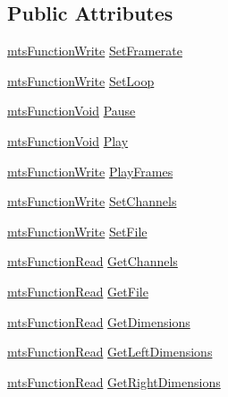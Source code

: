 \subsection*{Public Attributes}
\begin{DoxyCompactItemize}
\item 
\hyperlink{classmts_function_write}{mts\+Function\+Write} \hyperlink{class_i_req_filter_source_image_file_a9195480b969ae523fe65ce266895bd21}{Set\+Framerate}
\item 
\hyperlink{classmts_function_write}{mts\+Function\+Write} \hyperlink{class_i_req_filter_source_image_file_a6c0b3f702b2fe002ad47838d9e6d71cb}{Set\+Loop}
\item 
\hyperlink{classmts_function_void}{mts\+Function\+Void} \hyperlink{class_i_req_filter_source_image_file_a0be80794d65c123743666d95f60a9962}{Pause}
\item 
\hyperlink{classmts_function_void}{mts\+Function\+Void} \hyperlink{class_i_req_filter_source_image_file_a6ee044cc752177e47fbb970e08aa509f}{Play}
\item 
\hyperlink{classmts_function_write}{mts\+Function\+Write} \hyperlink{class_i_req_filter_source_image_file_ad4ffadbe87635cbdfa01daa364f41fb5}{Play\+Frames}
\item 
\hyperlink{classmts_function_write}{mts\+Function\+Write} \hyperlink{class_i_req_filter_source_image_file_a277fb1f67abe840dca507ed8caebc051}{Set\+Channels}
\item 
\hyperlink{classmts_function_write}{mts\+Function\+Write} \hyperlink{class_i_req_filter_source_image_file_acbcd51d212dee25261263e552040eb4f}{Set\+File}
\item 
\hyperlink{classmts_function_read}{mts\+Function\+Read} \hyperlink{class_i_req_filter_source_image_file_a345befbf65ef845dc9f12921fb9af095}{Get\+Channels}
\item 
\hyperlink{classmts_function_read}{mts\+Function\+Read} \hyperlink{class_i_req_filter_source_image_file_a4df0bd4fef3fc0b59d836bb9d0877399}{Get\+File}
\item 
\hyperlink{classmts_function_read}{mts\+Function\+Read} \hyperlink{class_i_req_filter_source_image_file_aebb760df4d6adc0e26a3ec0fa28e51de}{Get\+Dimensions}
\item 
\hyperlink{classmts_function_read}{mts\+Function\+Read} \hyperlink{class_i_req_filter_source_image_file_a35e1beacc48aae0e258a695918a1a476}{Get\+Left\+Dimensions}
\item 
\hyperlink{classmts_function_read}{mts\+Function\+Read} \hyperlink{class_i_req_filter_source_image_file_acafc0bb36a8f27952379c4a6af59deef}{Get\+Right\+Dimensions}
\end{DoxyCompactItemize}



